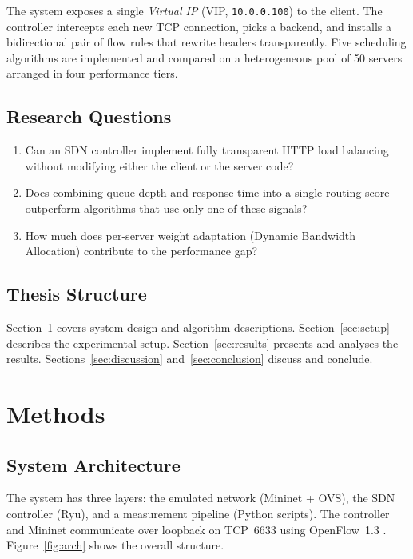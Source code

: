 \documentclass[10pt,a4paper,twocolumn]{article}
\numberwithin{figure}{section}
\numberwithin{table}{section}
\numberwithin{equation}{section}
\begin{document}
The system exposes a single \emph{Virtual IP} (VIP, \texttt{10.0.0.100}) to the
client. The controller intercepts each new TCP connection, picks a backend, and
installs a bidirectional pair of flow rules that rewrite headers transparently.
Five scheduling algorithms are implemented and compared on a heterogeneous pool
of 50 servers arranged in four performance tiers.

\subsection{Research Questions}

\begin{enumerate}
\item Can an SDN controller implement fully transparent HTTP load balancing without
  modifying either the client or the server code?
\item Does combining queue depth and response time into a single routing score
  outperform algorithms that use only one of these signals?
\item How much does per-server weight adaptation (Dynamic Bandwidth Allocation)
  contribute to the performance gap?
\end{enumerate}

\subsection{Thesis Structure}

Section~\ref{sec:methods} covers system design and algorithm descriptions.
Section~\ref{sec:setup} describes the experimental setup.
Section~\ref{sec:results} presents and analyses the results.
Sections~\ref{sec:discussion} and~\ref{sec:conclusion} discuss and conclude.

\section{Methods}
\label{sec:methods}

\subsection{System Architecture}

The system has three layers: the emulated network (Mininet + OVS), the SDN
controller (Ryu), and a measurement pipeline (Python scripts). The controller
and Mininet communicate over loopback on TCP~6633 using OpenFlow~1.3
\citep{of13spec}. Figure~\ref{fig:arch} shows the overall structure.
\end{document}
